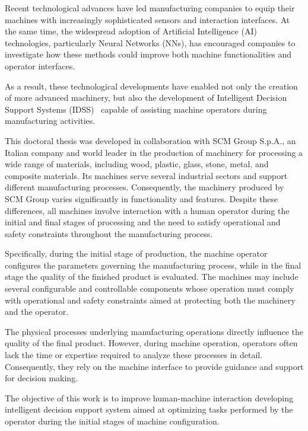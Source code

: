 \label{chap:introduction}

Recent technological advances have led manufacturing companies to equip their machines with increasingly sophisticated sensors and interaction interfaces. At the same time, the widespread adoption of Artificial Intelligence (AI) technologies, particularly Neural Networks (NNs), has encouraged companies to investigate how these methods could improve both machine functionalities and operator interfaces.

As a result, these technological developments have enabled not only the creation of more advanced machinery, but also the development of Intelligent Decision Support Systems (IDSS)~\cite{phillips2013intelligent} capable of assisting machine operators during manufacturing activities.

This doctoral thesis was developed in collaboration with SCM Group S.p.A., an Italian company and world leader in the production of machinery for processing a wide range of materials, including wood, plastic, glass, stone, metal, and composite materials. Its machines serve several industrial sectors and support different manufacturing processes. Consequently, the machinery produced by SCM Group varies significantly in functionality and features. Despite these differences, all machines involve interaction with a human operator during the initial and final stages of processing and the need to satisfy operational and safety constraints throughout the manufacturing process.

Specifically, during the initial stage of production, the machine operator configures the parameters governing the manufacturing process, while in the final stage the quality of the finished product is evaluated. The machines may include several configurable and controllable components whose operation must comply with operational and safety constraints aimed at protecting both the machinery and the operator.

The physical processes underlying manufacturing operations directly influence the quality of the final product. However, during machine operation, operators often lack the time or expertise required to analyze these processes in detail. Consequently, they rely on the machine interface to provide guidance and support for decision making.

The objective of this work is to improve human-machine interaction developing intelligent decision support system aimed at optimizing tasks performed by the operator during the initial stages of machine configuration.

